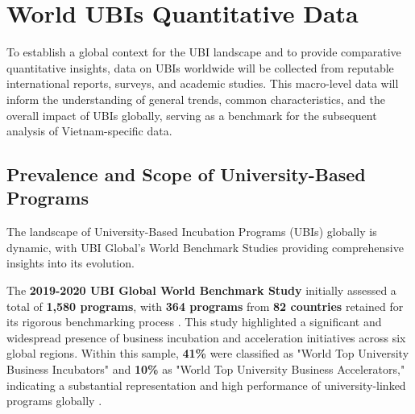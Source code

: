 \documentclass[../Main.tex]{subfiles}
\begin{document}
	\section{World UBIs Quantitative Data}
	To establish a global context for the UBI landscape and to provide comparative quantitative insights, data on UBIs worldwide will be collected from reputable international reports, surveys, and academic studies. This macro-level data will inform the understanding of general trends, common characteristics, and the overall impact of UBIs globally, serving as a benchmark for the subsequent analysis of Vietnam-specific data.
	
	\subsection{Prevalence and Scope of University-Based Programs}
	The landscape of University-Based Incubation Programs (UBIs) globally is dynamic, with UBI Global's World Benchmark Studies providing comprehensive insights into its evolution.
	
	The \textbf{2019-2020 UBI Global World Benchmark Study} initially assessed a total of \textbf{1,580 programs}, with \textbf{364 programs} from \textbf{82 countries} retained for its rigorous benchmarking process \cite{ubi2019world}. This study highlighted a significant and widespread presence of business incubation and acceleration initiatives across six global regions. Within this sample, \textbf{41\%} were classified as "World Top University Business Incubators" and \textbf{10\%} as "World Top University Business Accelerators," indicating a substantial representation and high performance of university-linked programs globally \cite{ubi2019world}.
	
\end{document}
